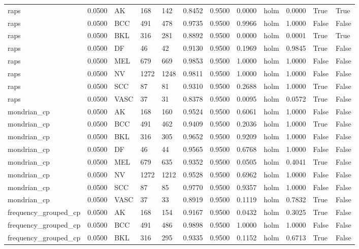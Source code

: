 \begin{table}[htbp]
\begin{tabular}{llllllllllll}
raps & 0.0500 & AK & 168 & 142 & 0.8452 & 0.9500 & 0.0000 & holm & 0.0000 & True & True \\
raps & 0.0500 & BCC & 491 & 478 & 0.9735 & 0.9500 & 0.9966 & holm & 1.0000 & False & False \\
raps & 0.0500 & BKL & 316 & 281 & 0.8892 & 0.9500 & 0.0000 & holm & 0.0001 & True & True \\
raps & 0.0500 & DF & 46 & 42 & 0.9130 & 0.9500 & 0.1969 & holm & 0.9845 & True & False \\
raps & 0.0500 & MEL & 679 & 669 & 0.9853 & 0.9500 & 1.0000 & holm & 1.0000 & False & False \\
raps & 0.0500 & NV & 1272 & 1248 & 0.9811 & 0.9500 & 1.0000 & holm & 1.0000 & False & False \\
raps & 0.0500 & SCC & 87 & 81 & 0.9310 & 0.9500 & 0.2688 & holm & 1.0000 & True & False \\
raps & 0.0500 & VASC & 37 & 31 & 0.8378 & 0.9500 & 0.0095 & holm & 0.0572 & True & False \\
mondrian\_cp & 0.0500 & AK & 168 & 160 & 0.9524 & 0.9500 & 0.6061 & holm & 1.0000 & False & False \\
mondrian\_cp & 0.0500 & BCC & 491 & 462 & 0.9409 & 0.9500 & 0.2036 & holm & 1.0000 & True & False \\
mondrian\_cp & 0.0500 & BKL & 316 & 305 & 0.9652 & 0.9500 & 0.9209 & holm & 1.0000 & False & False \\
mondrian\_cp & 0.0500 & DF & 46 & 44 & 0.9565 & 0.9500 & 0.6768 & holm & 1.0000 & False & False \\
mondrian\_cp & 0.0500 & MEL & 679 & 635 & 0.9352 & 0.9500 & 0.0505 & holm & 0.4041 & True & False \\
mondrian\_cp & 0.0500 & NV & 1272 & 1212 & 0.9528 & 0.9500 & 0.6962 & holm & 1.0000 & False & False \\
mondrian\_cp & 0.0500 & SCC & 87 & 85 & 0.9770 & 0.9500 & 0.9357 & holm & 1.0000 & False & False \\
mondrian\_cp & 0.0500 & VASC & 37 & 33 & 0.8919 & 0.9500 & 0.1119 & holm & 0.7832 & True & False \\
frequency\_grouped\_cp & 0.0500 & AK & 168 & 154 & 0.9167 & 0.9500 & 0.0432 & holm & 0.3025 & True & False \\
frequency\_grouped\_cp & 0.0500 & BCC & 491 & 486 & 0.9898 & 0.9500 & 1.0000 & holm & 1.0000 & False & False \\
frequency\_grouped\_cp & 0.0500 & BKL & 316 & 295 & 0.9335 & 0.9500 & 0.1152 & holm & 0.6713 & True & False \\

\end{tabular}
\end{table}
